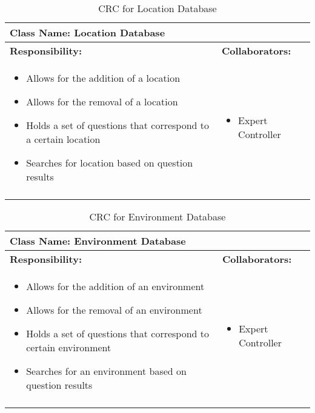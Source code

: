 \documentclass[titlepage]{article}
\begin{document}
	\begin{longtable}{| p{} | p{} |}
			\hline
			 \multicolumn{2}{|l|}{\textbf{Class Name: Location Database}} \\
			\hline
			\textbf{Responsibility:} & \textbf{Collaborators:} \\
			\hline
				\begin{itemize}
					\item Allows for the addition of a location
					\item Allows for the removal of a location
					\item Holds a set of questions that correspond to a certain location
					\item Searches for location based on question results
				\end{itemize} & 
				\begin{itemize}
					\item Expert Controller 
				\end{itemize} 
				\\
			\hline
		\caption{CRC for Location Database}
	\end{longtable}
	
	\begin{longtable}{| p{} | p{} |}
			\hline
			 \multicolumn{2}{|l|}{\textbf{Class Name: Environment Database}} \\
			\hline
			\textbf{Responsibility:} & \textbf{Collaborators:} \\
			\hline
				\begin{itemize}
					\item Allows for the addition of an environment
					\item Allows for the removal of an environment
					\item Holds a set of questions that correspond to certain environment
					\item Searches for an environment based on question results
				\end{itemize} & 
				\begin{itemize}
					\item Expert Controller
				\end{itemize} 
				\\
			\hline
		\caption{CRC for Environment Database}
	\end{longtable}
	
\end{document}
